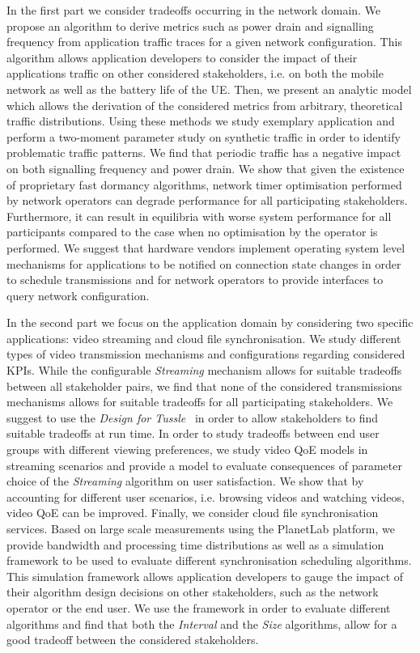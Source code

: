 In the first part we consider tradeoffs occurring in the network domain.
We propose an algorithm to derive metrics such as power drain and signalling frequency from application traffic traces for a given network configuration.
This algorithm allows application developers to consider the impact of their applications  traffic on other considered stakeholders, i.e. on both the mobile network as well as the battery life of the \gls{UE}.
Then, we present an analytic model which allows the derivation of the considered metrics from arbitrary, theoretical traffic distributions.
Using these methods we study exemplary application and perform a two-moment parameter study on synthetic traffic in order to identify problematic traffic patterns.
We find that periodic traffic has a negative impact on both signalling frequency and power drain.
We show that given the existence of proprietary fast dormancy algorithms, network timer optimisation performed by network operators can degrade performance for all participating stakeholders.
Furthermore, it can result in equilibria with worse system performance for all participants compared to the case when no optimisation by the operator is performed.
We suggest that hardware vendors implement operating system level mechanisms for applications to be notified on connection state changes in order to schedule transmissions and for network operators to provide interfaces to query network configuration.

In the second part we focus on the application domain by considering two specific applications: video streaming and cloud file synchronisation.
We study different types of video transmission mechanisms and configurations regarding considered \glspl{KPI}.
While the configurable \emph{Streaming} mechanism allows for suitable tradeoffs between all stakeholder pairs, we find that none of the considered transmissions mechanisms allows for suitable tradeoffs for all participating stakeholders.
We suggest to use the \emph{Design for Tussle}~\cite{Clark2005} in order to allow stakeholders to find suitable tradeoffs at run time.
In order to study tradeoffs between end user groups with different viewing preferences, we study video \gls{QoE} models in streaming scenarios and provide a model to evaluate consequences of parameter choice of the \emph{Streaming} algorithm on user satisfaction.
We show that by accounting for different user scenarios, i.e. browsing videos and watching videos, video \gls{QoE} can be improved.
Finally, we consider cloud file synchronisation services.
Based on large scale measurements using the PlanetLab platform, we provide bandwidth and processing time distributions as well as a simulation framework to be used to evaluate different synchronisation scheduling algorithms.
This simulation framework allows application developers to gauge the impact of their algorithm design decisions on other stakeholders, such as the network operator or the end user.
We use the framework in order to evaluate different algorithms and find that both the \emph{Interval} and the \emph{Size} algorithms, allow for a good tradeoff between the considered stakeholders.

